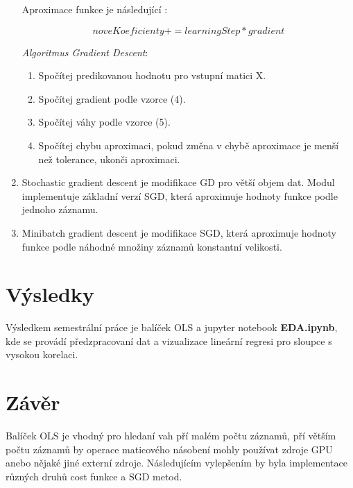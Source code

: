 \documentclass[czech]{pyt-report}
\begin{document}
\begin{enumerate}
Aproximace funkce je následující :

\begin{equation}
noveKoeficienty += learningStep * gradient
\end{equation}

\textit{Algoritmus Gradient Descent}:

\begin{enumerate}
\item Spočítej predikovanou hodnotu pro vstupní matici X.
\item Spočítej gradient podle vzorce (4).
\item Spočítej váhy podle vzorce (5).
\item Spočítej chybu aproximaci, pokud změna v chybě aproximace je menší než tolerance, ukonči aproximaci.
\end{enumerate}

\item Stochastic gradient descent je modifikace GD pro větší objem dat. Modul implementuje základní verzí SGD, která aproximuje hodnoty funkce podle jednoho záznamu. \cite{sgd_ref}
\item Minibatch gradient descent je modifikace SGD, která aproximuje hodnoty funkce podle náhodné množiny záznamů konstantní velikosti.
\end{enumerate} 

\section{Výsledky}
Výsledkem semestrální práce je balíček OLS a jupyter notebook \textbf{EDA.ipynb}, kde se provádí předzpracovaní dat a vizualizace lineární regresi pro sloupce s vysokou korelaci.
\section{Závěr}
Balíček OLS je vhodný pro hledaní vah pří malém počtu záznamů, pří větším počtu záznamů by operace maticového násobení mohly používat zdroje GPU anebo nějaké jiné externí zdroje. Následujícím vylepšením by byla implementace různých druhů cost funkce a SGD metod.
%

\end{document}
